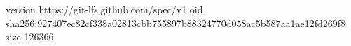version https://git-lfs.github.com/spec/v1
oid sha256:927407ec82cf338a02813cbb755897b88324770d058ac5b587aa1ae12fd269f8
size 126366
